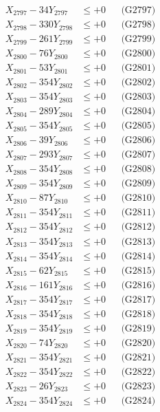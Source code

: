 \documentclass[a4paper,10pt]{article}
\begin{document}
{\begin{align}
X_{2797} - 34Y_{2797} &\leq +0 && \text{(G2797)} \\
X_{2798} - 330Y_{2798} &\leq +0 && \text{(G2798)} \\
X_{2799} - 261Y_{2799} &\leq +0 && \text{(G2799)} \\
X_{2800} - 76Y_{2800} &\leq +0 && \text{(G2800)} \\
\allowbreak
X_{2801} - 53Y_{2801} &\leq +0 && \text{(G2801)} \\
X_{2802} - 354Y_{2802} &\leq +0 && \text{(G2802)} \\
X_{2803} - 354Y_{2803} &\leq +0 && \text{(G2803)} \\
X_{2804} - 289Y_{2804} &\leq +0 && \text{(G2804)} \\
X_{2805} - 354Y_{2805} &\leq +0 && \text{(G2805)} \\
X_{2806} - 39Y_{2806} &\leq +0 && \text{(G2806)} \\
X_{2807} - 293Y_{2807} &\leq +0 && \text{(G2807)} \\
X_{2808} - 354Y_{2808} &\leq +0 && \text{(G2808)} \\
X_{2809} - 354Y_{2809} &\leq +0 && \text{(G2809)} \\
X_{2810} - 87Y_{2810} &\leq +0 && \text{(G2810)} \\
\allowbreak
X_{2811} - 354Y_{2811} &\leq +0 && \text{(G2811)} \\
X_{2812} - 354Y_{2812} &\leq +0 && \text{(G2812)} \\
X_{2813} - 354Y_{2813} &\leq +0 && \text{(G2813)} \\
X_{2814} - 354Y_{2814} &\leq +0 && \text{(G2814)} \\
X_{2815} - 62Y_{2815} &\leq +0 && \text{(G2815)} \\
X_{2816} - 161Y_{2816} &\leq +0 && \text{(G2816)} \\
X_{2817} - 354Y_{2817} &\leq +0 && \text{(G2817)} \\
X_{2818} - 354Y_{2818} &\leq +0 && \text{(G2818)} \\
X_{2819} - 354Y_{2819} &\leq +0 && \text{(G2819)} \\
X_{2820} - 74Y_{2820} &\leq +0 && \text{(G2820)} \\
\allowbreak
X_{2821} - 354Y_{2821} &\leq +0 && \text{(G2821)} \\
X_{2822} - 354Y_{2822} &\leq +0 && \text{(G2822)} \\
X_{2823} - 26Y_{2823} &\leq +0 && \text{(G2823)} \\
X_{2824} - 354Y_{2824} &\leq +0 && \text{(G2824)} \\

\end{align}}
\end{document}
